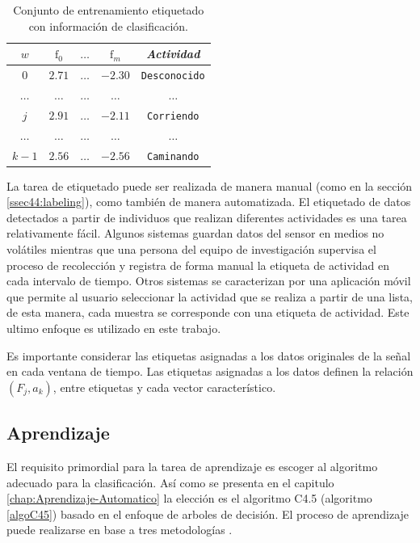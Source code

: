 \begin{table}[!tbph]
\begin{centering}
\begin{tabular}{|c|c|c|c|c|}
\hline 
$w$ & $\mathrm{f}_{0}$ & $\ldots$ & $\mathrm{f}_{m}$ & \emph{Actividad}\tabularnewline
\hline 
\hline 
$0$ & $2.71$ & \texttt{$\ldots$} & \texttt{$-2.30$} & \texttt{\small{}Desconocido}\tabularnewline
\hline 
$\ldots$ & $\ldots$ & \texttt{$\ldots$} & \texttt{$\ldots$} & \texttt{$\ldots$}\tabularnewline
\hline 
$j$ & $2.91$ & \texttt{$\ldots$} & \texttt{$-2.11$} & \texttt{\small{}Corriendo}\tabularnewline
\hline 
$\ldots$ & $\ldots$ & \texttt{$\ldots$} & \texttt{$\ldots$} & \texttt{$\ldots$}\tabularnewline
\hline 
$k-1$ & $2.56$ & \texttt{$\ldots$} & \texttt{$-2.56$} & \texttt{\small{}Caminando}\tabularnewline
\hline 
\end{tabular}
\par\end{centering}
\caption[Instancias etiquetadas]{\label{tab4:labeled}Conjunto de entrenamiento etiquetado con información
de clasificación.}
\end{table}

La tarea de etiquetado puede ser realizada de manera manual (como
en la sección \ref{ssec44:labeling}), como también de manera automatizada.
El etiquetado de datos detectados a partir de individuos que realizan
diferentes actividades es una tarea relativamente fácil. Algunos sistemas
guardan datos del sensor en medios no volátiles mientras que una persona
del equipo de investigación supervisa el proceso de recolección y
registra de forma manual la etiqueta de actividad en cada intervalo
de tiempo. Otros sistemas se caracterizan por una aplicación móvil
que permite al usuario seleccionar la actividad que se realiza a partir
de una lista, de esta manera, cada muestra se corresponde con una
etiqueta de actividad. Este ultimo enfoque es utilizado en este trabajo.

Es importante considerar las etiquetas asignadas a los datos originales
de la señal en cada ventana de tiempo. Las etiquetas asignadas a los
datos definen la relación $(F_{j},a_{k})$, entre etiquetas y cada
vector característico. 

\subsection{Aprendizaje}

El requisito primordial para la tarea de aprendizaje es escoger al
algoritmo adecuado para la clasificación. Así como se presenta en
el capitulo \ref{chap:Aprendizaje-Automatico} la elección es el algoritmo
C4.5 (algoritmo \ref{algoC45}) basado en el enfoque de arboles de
decisión. El proceso de aprendizaje puede realizarse en base a tres
metodologías \cite{Rajaraman2011}.

